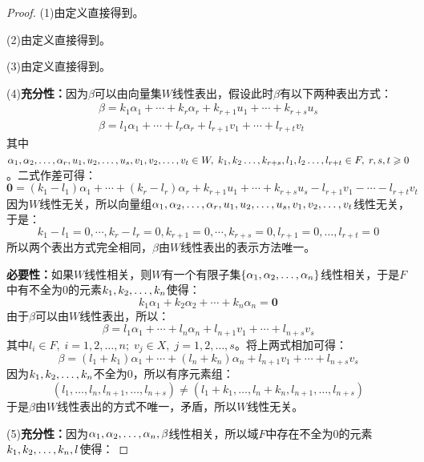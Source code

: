 \begin{proof}
	(1)由定义直接得到。\par
	(2)由定义直接得到。\par
	(3)由定义直接得到。\par
	(4)\textbf{充分性：}因为$\beta$可以由向量集$W$线性表出，假设此时$\beta$有以下两种表出方式：
	\begin{gather*}
		\beta=k_1\alpha_1+\cdots+k_r\alpha_r+k_{r+1}u_1+\cdots+k_{r+s}u_s \\
		\beta=l_1\alpha_1+\cdots+l_r\alpha_r+l_{r+1}v_1+\cdots+l_{r+t}v_t
	\end{gather*}
	其中$\alpha_1, \alpha_2, \dots, \alpha_{r},u_1, u_2, \dots, u_{s},v_1, v_2, \dots, v_{t}\in W,\;k_1,k_2\dots,k_{r+s},l_1,l_2\dots,l_{r+t}\in F,\;r,s,t\geqslant0$。二式作差可得：
	\begin{equation*}
		\mathbf{0}=(k_1-l_1)\alpha_1+\cdots+(k_r-l_r)\alpha_r+k_{r+1}u_1+\cdots+k_{r+s}u_s-l_{r+1}v_1-\cdots-l_{r+t}v_t
	\end{equation*}
	因为$W$线性无关，所以向量组$\alpha_1, \alpha_2, \dots, \alpha_{r},u_1, u_2, \dots, u_{s},v_1, v_2, \dots, v_{t}$线性无关，于是：
	\begin{equation*}
		k_1-l_1=0,\cdots,k_r-l_r=0,k_{r+1}=0,\cdots,k_{r+s}=0,l_{r+1}=0,\dots,l_{r+t}=0
	\end{equation*}
	所以两个表出方式完全相同，$\beta$由$W$线性表出的表示方法唯一。\par
	\textbf{必要性：}如果$W$线性相关，则$W$有一个有限子集$\{\alpha_1, \alpha_2, \dots, \alpha_{n}\}$线性相关，于是$F$中有不全为$0$的元素$k_1, k_2, \dots, k_{n}$使得：
	\begin{equation*}
		k_1\alpha_1+k_2\alpha_2+\cdots+k_n\alpha_n=\mathbf{0}
	\end{equation*}
	由于$\beta$可以由$W$线性表出，所以：
	\begin{equation*}
		\beta=l_1\alpha_1+\cdots+l_n\alpha_n+l_{n+1}v_1+\cdots+l_{n+s}v_s
	\end{equation*}
	其中$l_i\in F,\;i=1,2,\dots,n;\;v_j\in X,\;j=1,2,\dots,s$。将上两式相加可得：
	\begin{equation*}
		\beta=(l_1+k_1)\alpha_1+\cdots+(l_n+k_n)\alpha_n+l_{n+1}v_1+\cdots+l_{n+s}v_s
	\end{equation*}
	因为$k_1, k_2, \dots, k_{n}$不全为$0$，所以有序元素组：
	\begin{equation*}
		(l_1,\dots,l_n,l_{n+1},\dots,l_{n+s})\ne(l_1+k_1,\dots,l_n+k_n,l_{n+1},\dots,l_{n+s})
	\end{equation*}
	于是$\beta$由$W$线性表出的方式不唯一，矛盾，所以$W$线性无关。\par
	(5)\textbf{充分性：}因为$\alpha_1, \alpha_2, \dots, \alpha_{n},\beta$线性相关，所以域$F$中存在不全为$0$的元素$k_1, k_2, \dots, k_{n},l$使得：

\end{proof}
